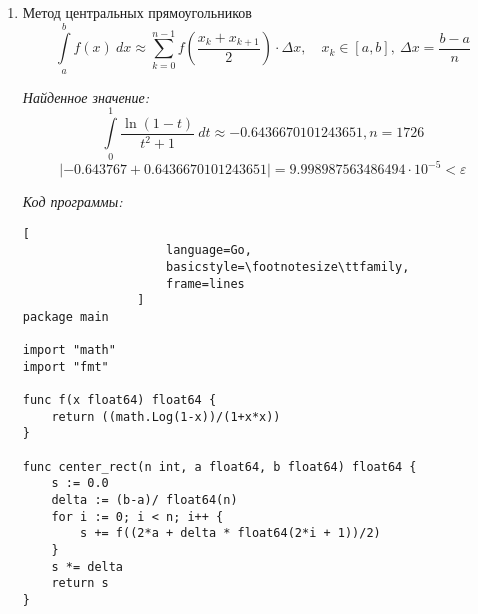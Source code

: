 \documentclass[14pt, a4paper, titlepage, fleqn]{extarticle}
\begin{document}
\begin{enumerate}
                \textit{Код программы:}
                \begin{lstlisting}[
                    language=Go,
                    basicstyle=\footnotesize\ttfamily,
                    frame=lines
                ]
package main

import "math"
import "fmt"

func f(x float64) float64 {
    return ((math.Log(1-x))/(1+x*x))
}

func right_rect(n int, a float64, b float64) float64 {
    s := 0.0
    delta := (b-a)/ float64(n)
    eps := 1e-5
    for i := 1; i <= n; i++ {
        if (i != n) {
            s += f(a + delta * float64(i))
        } else {
            s += f(a + delta * float64(i) - eps)
        }
    }
    s *= delta
    return s
}

func main() {
    n := 0
    eps := 1e-4
    a := 0.0
    b := 1.0
    real := -0.643767
    s := 10000
    n=0
    for math.Abs(real - s) >= eps {
        n++
        s = right_rect(n,a,b)
    }
    fmt.Println(s, n, math.Abs(real-s))
}
                \end{lstlisting}
                
                \item Метод центральных прямоугольников
                \[
                    \int\limits_a^b f(x) ~ dx \approx
                    \sum_{k=0}^{n-1} f\left( \frac{x_k + x_{k+1}}{2}\right)\cdot
                    \Delta x,
                    \quad x_k \in [a, b], ~ \Delta x = \frac{b-a}{n}    
                \]

                \textit{Найденное значение:}
                \[
                    \int\limits_0^1 \frac{\ln(1-t)}{t^2+1} ~ dt \approx
                    -0.6436670101243651, n = 1726
                \]
                \[
                    |-0.643767+0.6436670101243651| = 9.998987563486494 
                    \cdot 10^{-5} < \varepsilon
                \]

                \textit{Код программы:}
                \begin{lstlisting}[
                    language=Go,
                    basicstyle=\footnotesize\ttfamily,
                    frame=lines
                ]
package main

import "math"
import "fmt"

func f(x float64) float64 {
    return ((math.Log(1-x))/(1+x*x))
}

func center_rect(n int, a float64, b float64) float64 {
    s := 0.0
    delta := (b-a)/ float64(n)
    for i := 0; i < n; i++ {
        s += f((2*a + delta * float64(2*i + 1))/2)
    }
    s *= delta
    return s
}


\end{lstlisting}
\end{enumerate}
\end{document}

